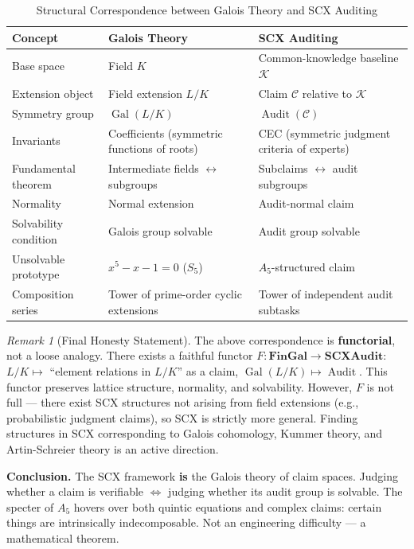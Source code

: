 \documentclass[10pt,a4paper]{article}
\theoremstyle{remark}
\newtheorem{remark}[theorem]{Remark}
\DeclareMathOperator{\Gal}{Gal}
\DeclareMathOperator{\Audit}{Audit}
\newcommand{\K}{\mathcal{K}}
\newcommand{\cC}{\mathcal{C}}
\begin{document}
\begin{table}[h]
\centering
\caption{Structural Correspondence between Galois Theory and SCX Auditing}
\small
\begin{tabular}{@{}p{3.6cm} p{3.6cm} p{4cm}@{}}
\toprule
\textbf{Concept} & \textbf{Galois Theory} & \textbf{SCX Auditing} \\
\midrule
Base space & Field $K$ & Common-knowledge baseline $\K$ \\
Extension object & Field extension $L/K$ & Claim $\cC$ relative to $\K$ \\
Symmetry group & $\Gal(L/K)$ & $\Audit(\cC)$ \\
Invariants & Coefficients (symmetric functions of roots) & CEC (symmetric judgment criteria of experts) \\
Fundamental theorem & Intermediate fields $\leftrightarrow$ subgroups & Subclaims $\leftrightarrow$ audit subgroups \\
Normality & Normal extension & Audit-normal claim \\
Solvability condition & Galois group solvable & Audit group solvable \\
Unsolvable prototype & $x^5-x-1=0$ ($S_5$) & $A_5$-structured claim \\
Composition series & Tower of prime-order cyclic extensions & Tower of independent audit subtasks \\
\bottomrule
\end{tabular}
\end{table}

\begin{remark}[Final Honesty Statement]
The above correspondence is \textbf{functorial}, not a loose analogy. There exists a faithful functor $F: \mathbf{FinGal} \to \mathbf{SCXAudit}$: $L/K\mapsto$ ``element relations in $L/K$'' as a claim, $\Gal(L/K)\mapsto\Audit$. This functor preserves lattice structure, normality, and solvability. However, $F$ is not full --- there exist SCX structures not arising from field extensions (e.g., probabilistic judgment claims), so SCX is strictly more general. Finding structures in SCX corresponding to Galois cohomology, Kummer theory, and Artin-Schreier theory is an active direction.
\end{remark}

\textbf{Conclusion.} The SCX framework \textbf{is} the Galois theory of claim spaces. Judging whether a claim is verifiable $\iff$ judging whether its audit group is solvable. The specter of $A_5$ hovers over both quintic equations and complex claims: certain things are intrinsically indecomposable. Not an engineering difficulty --- a mathematical theorem.
\end{document}
